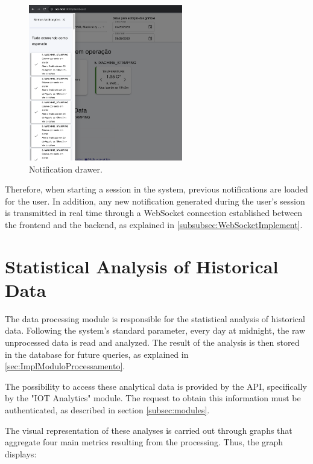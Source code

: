 \begin{figure}[htbp]
	\centering
	\includegraphics[width=0.6\textwidth]{images/notification.png}
	\caption{Notification drawer.}
	\label{fig:notificationDrawer}
\end{figure}


Therefore, when starting a session in the system, previous notifications are loaded for the user. In addition, any new notification generated during the user's session is transmitted in real time through a WebSocket connection established between the frontend and the backend, as explained in \ref{subsubsec:WebSocketImplement}.


\section[Statistical Analysis of Historical Data]{Statistical Analysis of Historical Data}\label{sec:histicalGraphs}

The data processing module is responsible for the statistical analysis of historical data. Following the system's standard parameter, every day at midnight, the raw unprocessed data is read and analyzed. The result of the analysis is then stored in the database for future queries, as explained in \ref{sec:ImplModuloProcessamento}.

The possibility to access these analytical data is provided by the \gls{API}, specifically by the "IOT Analytics" module. The request to obtain this information must be authenticated, as described in section \ref{subsec:modules}.

The visual representation of these analyses is carried out through graphs that aggregate four main metrics resulting from the processing. Thus, the graph displays:

